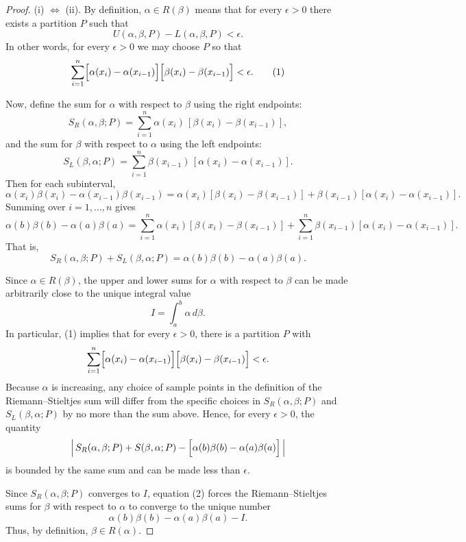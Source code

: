 \documentclass[11pt]{article}
\begin{document}
\begin{exercise}{3}
    \begin{proof} (i) $\iff$ (ii). By definition, $\alpha\in R(\beta)$ means that for every $\epsilon>0$ there exists a partition $P$ such that
\[
U(\alpha,\beta,P)-L(\alpha,\beta,P)<\epsilon.
\]
In other words, for every $\epsilon>0$ we may choose $P$ so that
\[
\sum_{i=1}^n\Bigl[\alpha(x_i)-\alpha(x_{i-1})\Bigr]\Bigl[\beta(x_i)-\beta(x_{i-1})\Bigr]<\epsilon.
\tag{1}
\]

Now, define the sum for $\alpha$ with respect to $\beta$ using the right endpoints:
\[
S_R(\alpha,\beta;P)=\sum_{i=1}^n \alpha(x_i)\,[\beta(x_i)-\beta(x_{i-1})],
\]
and the sum for $\beta$ with respect to $\alpha$ using the left endpoints:
\[
S_L(\beta,\alpha;P)=\sum_{i=1}^n \beta(x_{i-1})\,[\alpha(x_i)-\alpha(x_{i-1})].
\]
Then for each subinterval,
\[
\alpha(x_i)\beta(x_i)-\alpha(x_{i-1})\beta(x_{i-1})
=\alpha(x_i)[\beta(x_i)-\beta(x_{i-1})]+\beta(x_{i-1})[\alpha(x_i)-\alpha(x_{i-1})].
\]
Summing over $i=1,\dots,n$ gives
\[
\alpha(b)\beta(b)-\alpha(a)\beta(a)
=\sum_{i=1}^n \alpha(x_i)[\beta(x_i)-\beta(x_{i-1})]
+\sum_{i=1}^n \beta(x_{i-1})[\alpha(x_i)-\alpha(x_{i-1})].
\tag{2}
\]
That is,
\[
S_R(\alpha,\beta;P)+S_L(\beta,\alpha;P)=\alpha(b)\beta(b)-\alpha(a)\beta(a).
\]

Since $\alpha\in R(\beta)$, the upper and lower sums for $\alpha$ with respect to $\beta$ can be made arbitrarily close to the unique integral value 
\[
I=\int_a^b \alpha\,d\beta.
\]
In particular, (1) implies that for every $\epsilon>0$, there is a partition $P$ with
\[
\sum_{i=1}^n\Bigl[\alpha(x_i)-\alpha(x_{i-1})\Bigr]\Bigl[\beta(x_i)-\beta(x_{i-1})\Bigr]<\epsilon.
\]
Because $\alpha$ is increasing, any choice of sample points in the definition of the Riemann--Stieltjes sum will differ from the specific choices in $S_R(\alpha,\beta;P)$ and $S_L(\beta,\alpha;P)$ by no more than the sum above. Hence, for every $\epsilon>0$, the quantity
\[
\Bigl|\,S_R(\alpha,\beta;P)+S(\beta,\alpha;P)-\Bigl[\alpha(b)\beta(b)-\alpha(a)\beta(a)\Bigr]\,\Bigr|
\]
is bounded by the same sum and can be made less than $\epsilon$.

Since $S_R(\alpha,\beta;P)$ converges to $I$, equation (2) forces the Riemann--Stieltjes sums for $\beta$ with respect to $\alpha$ to converge to the unique number
\[
\alpha(b)\beta(b)-\alpha(a)\beta(a)-I.
\]
Thus, by definition, $\beta\in R(\alpha)$.


\end{proof}
\end{exercise}
\end{document}
